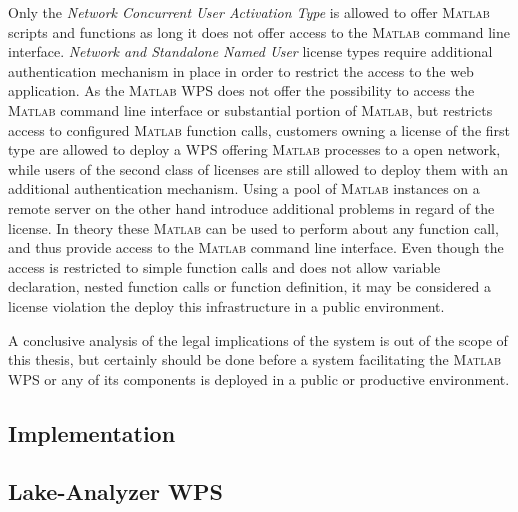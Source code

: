 		Only the \emph{Network Concurrent User Activation Type} is allowed to offer \textsc{Matlab} scripts and functions as long it does not offer access to the \textsc{Matlab} command line interface. \emph{Network and Standalone Named User} license types require additional authentication mechanism in place in order to restrict the access to the web application. As the \textsc{Matlab} WPS does not offer the possibility to access the \textsc{Matlab} command line interface or substantial portion of \textsc{Matlab}, but restricts access to configured \textsc{Matlab} function calls, customers owning a license of the first type are allowed to deploy a \ac{WPS} offering \textsc{Matlab} processes to a open network, while users of the second class of licenses are still allowed to deploy them with an additional authentication mechanism. Using a pool of \textsc{Matlab} instances on a remote server on the other hand introduce additional problems in regard of the license. In theory these \textsc{Matlab} can be used to perform about any function call, and thus provide access to the \textsc{Matlab} command line interface. Even though the access is restricted to simple function calls and does not allow variable declaration, nested function calls or function definition, it may be considered a license violation the deploy this infrastructure in a public environment.

		A conclusive analysis of the legal implications of the system is out of the scope of this thesis, but certainly should be done before a system facilitating the \textsc{Matlab} WPS or any of its components is deployed in a public or productive environment.
	\subsection{Implementation}

	\subsection{Lake-Analyzer WPS}
